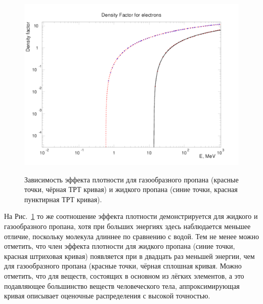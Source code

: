 \documentclass[a4paper,12pt]{article}
\begin{document}
\begin{large}
  \begin{figure}[ht]
    {
       \includegraphics[width=0.99\linewidth]{images/denf_prop}
    }
    \caption{Зависимость эффекта плотности для газообразного пропана (красные точки, чёрная ТРТ кривая) и жидкого пропана (синие точки, красная пунктирная ТРТ кривая).}
    \label{fig:denf_prop}
  \end{figure}
  На Рис.~\ref{fig:denf_prop} то же соотношение эффекта плотности демонстрируется для жидкого и газообразного пропана, хотя при больших энергиях здесь наблюдается меньшее отличие, поскольку молекула длиннее по сравнению с водой.
  Тем не менее можно отметить, что член эффекта плотности для жидкого пропана (синие точки, красная штриховая кривая) появляется при в двадцать раз меньшей энергии, чем для газообразного пропана (красные точки, чёрная сплошная кривая.
  Можно отметить, что для веществ, состоящих в основном из лёгких элементов, а это подавляющее большинство веществ человеческого тела, аппроксимирующая кривая описывает оценочные распределения с высокой точностью.


\end{large}
\end{document}
